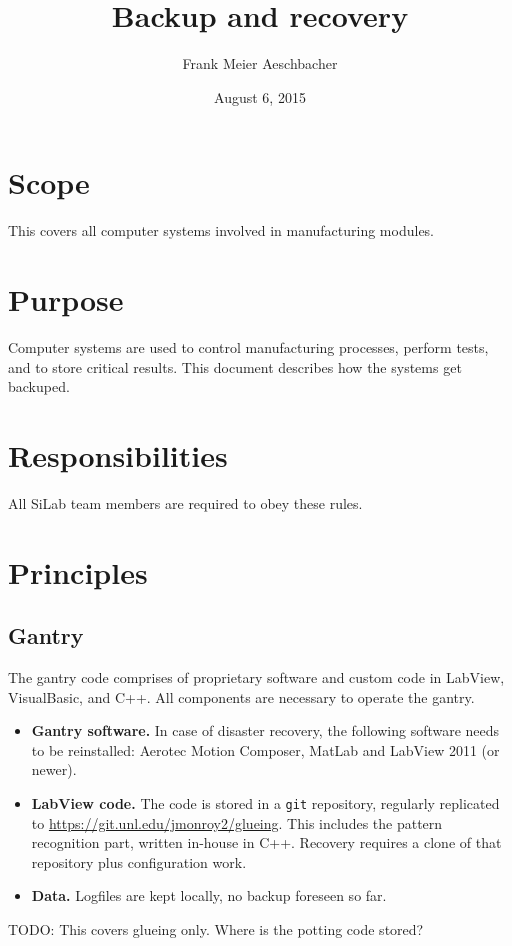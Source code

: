 \documentclass[12pt]{unlsilabsop}
\title{Backup and recovery}
\date{August 6, 2015}
\author{Frank Meier Aeschbacher}
\begin{document}
\maketitle

\section{Scope}
This covers all computer systems involved in manufacturing modules.

\section{Purpose}
Computer systems are used to control manufacturing processes, perform tests, and to store critical results. This document describes how the systems get backuped.


\section{Responsibilities}
All SiLab team members are required to obey these rules.

\section{Principles}

\subsection{Gantry}
The gantry code comprises of proprietary software and custom code in LabView, VisualBasic, and C++. All components are necessary to operate the gantry.
\begin{itemize}
    \item \textbf{Gantry software.} In case of disaster recovery, the following software needs to be reinstalled: Aerotec Motion Composer, MatLab and LabView 2011 (or newer).
    \item \textbf{LabView code.} The code is stored in a \texttt{git} repository, regularly replicated to \url{https://git.unl.edu/jmonroy2/glueing}. This includes the pattern recognition part, written in-house in C++. Recovery requires a clone of that repository plus configuration work.
    \item \textbf{Data.} Logfiles are kept locally, no backup foreseen so far.
\end{itemize}
TODO: This covers glueing only. Where is the potting code stored?
\end{document}
